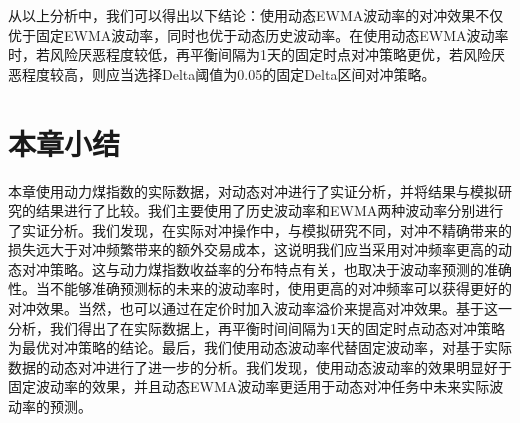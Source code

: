 从以上分析中，我们可以得出以下结论：使用动态EWMA波动率的对冲效果不仅优于固定EWMA波动率，同时也优于动态历史波动率。在使用动态EWMA波动率时，若风险厌恶程度较低，再平衡间隔为1天的固定时点对冲策略更优，若风险厌恶程度较高，则应当选择Delta阈值为0.05的固定Delta区间对冲策略。

\section{本章小结}

本章使用动力煤指数的实际数据，对动态对冲进行了实证分析，并将结果与模拟研究的结果进行了比较。我们主要使用了历史波动率和EWMA两种波动率分别进行了实证分析。我们发现，在实际对冲操作中，与模拟研究不同，对冲不精确带来的损失远大于对冲频繁带来的额外交易成本，这说明我们应当采用对冲频率更高的动态对冲策略。这与动力煤指数收益率的分布特点有关，也取决于波动率预测的准确性。当不能够准确预测标的未来的波动率时，使用更高的对冲频率可以获得更好的对冲效果。当然，也可以通过在定价时加入波动率溢价来提高对冲效果。基于这一分析，我们得出了在实际数据上，再平衡时间间隔为1天的固定时点动态对冲策略为最优对冲策略的结论。最后，我们使用动态波动率代替固定波动率，对基于实际数据的动态对冲进行了进一步的分析。我们发现，使用动态波动率的效果明显好于固定波动率的效果，并且动态EWMA波动率更适用于动态对冲任务中未来实际波动率的预测。
